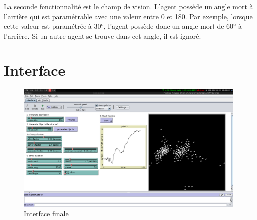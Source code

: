 \documentclass{article}
\begin{document}
La seconde fonctionnalité est le champ de vision. L'agent possède un angle mort à l'arrière qui est paramétrable avec une valeur entre 0 et 180. Par exemple, lorsque cette valeur est paramétrée à 30°, l'agent possède donc un angle mort de 60° à l'arrière. Si un autre agent se trouve dans cet angle, il est ignoré.

\section{Interface}
\begin{figure}[h]
	\begin{center}
		\includegraphics[scale=0.3]{img/interface}
		\caption{Interface finale}
		\label{fig:interface}
	\end{center}
\end{figure}
\end{document}
